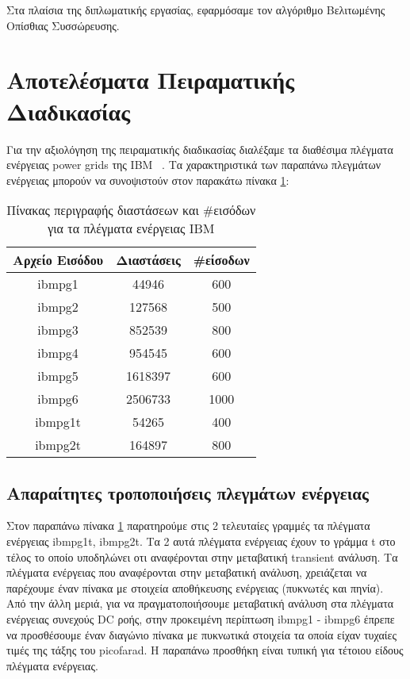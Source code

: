 Στα πλαίσια της διπλωματικής εργασίας, εφαρμόσαμε τον αλγόριθμο Βελιτωμένης Οπίσθιας Συσσώρευσης.

\section{Αποτελέσματα Πειραματικής Διαδικασίας}

Για την αξιολόγηση της πειραματικής διαδικασίας διαλέξαμε τα διαθέσιμα πλέγματα ενέργειας \textlatin{power grids} της \textlatin{IBM} ~\cite{nassif2008power}. Τα χαρακτηριστικά των παραπάνω πλεγμάτων ενέργειας μπορούν να συνοψιστούν στον παρακάτω πίνακα \ref{table:1}:

\begin{table}[h!]
\centering
 \begin{tabular}{||c | c | c||} 
 \hline
 Αρχείο Εισόδου & Διαστάσεις & \textlatin{\#}είσοδων \\ [0.5ex] 
 \hline\hline
 \textlatin{ibmpg1} & 44946 & 600 \\ 
 \hline
 \textlatin{ibmpg2} & 127568 & 500 \\
 \hline
 \textlatin{ibmpg3} & 852539 & 800 \\
 \hline
 \textlatin{ibmpg4} & 954545 & 600 \\
 \hline
 \textlatin{ibmpg5} & 1618397 & 600 \\
 \hline
 \textlatin{ibmpg6} & 2506733 & 1000 \\
 \hline
 \textlatin{ibmpg1t} & 54265 & 400 \\
 \hline
 \textlatin{ibmpg2t} & 164897 & 800 \\
 \hline
\end{tabular}
\caption{Πίνακας περιγραφής διαστάσεων και \textlatin{\#}εισόδων για τα πλέγματα ενέργειας \textlatin{IBM}}
\label{table:1}
\end{table}

\subsection{Απαραίτητες τροποποιήσεις πλεγμάτων ενέργειας}
Στον παραπάνω πίνακα \ref{table:1} παρατηρούμε στις 2 τελευταίες γραμμές τα πλέγματα ενέργειας \textlatin{ibmpg1t, ibmpg2t}. Τα 2 αυτά πλέγματα ενέργειας έχουν το γράμμα \textlatin{t} στο τέλος το οποίο υποδηλώνει οτι αναφέρονται στην μεταβατική \textlatin{transient} ανάλυση. Τα πλέγματα ενέργειας που αναφέρονται στην μεταβατική ανάλυση, χρειάζεται να παρέχουμε έναν πίνακα με στοιχεία αποθήκευσης ενέργειας (πυκνωτές και πηνία). Από την άλλη μεριά, για να πραγματοποιήσουμε μεταβατική ανάλυση στα πλέγματα ενέργειας συνεχούς \textlatin{DC} ροής, στην προκειμένη περίπτωση \textlatin{ibmpg1 - ibmpg6} έπρεπε να προσθέσουμε έναν διαγώνιο πίνακα με πυκνωτικά στοιχεία τα οποία είχαν τυχαίες τιμές της τάξης του \textlatin{picofarad}. Η παραπάνω προσθήκη είναι τυπική για τέτοιου είδους πλέγματα ενέργειας.


